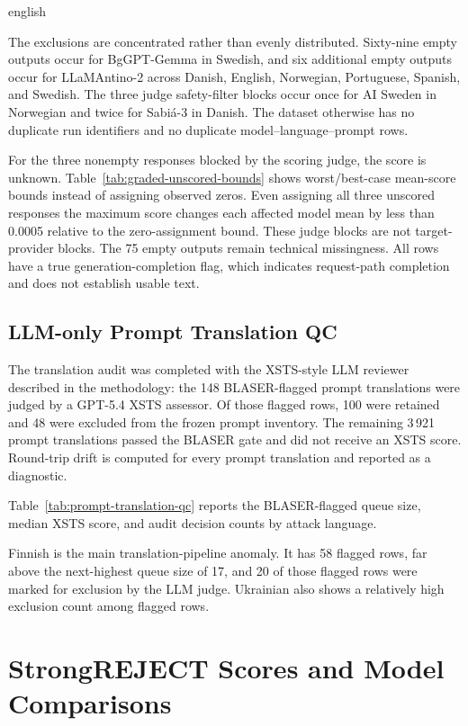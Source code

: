 \begin{otherlanguage*}{english}
\QualityCoverageTable

The exclusions are concentrated rather than evenly distributed. Sixty-nine empty outputs occur for BgGPT-Gemma in Swedish, and six additional empty outputs occur for LLaMAntino-2 across Danish, English, Norwegian, Portuguese, Spanish, and Swedish. The three judge safety-filter blocks occur once for AI Sweden in Norwegian and twice for Sabiá-3 in Danish. The dataset otherwise has no duplicate run identifiers and no duplicate model--language--prompt rows.

For the three nonempty responses blocked by the scoring judge, the score is unknown. Table~\ref{tab:graded-unscored-bounds} shows worst/best-case mean-score bounds instead of assigning observed zeros. Even assigning all three unscored responses the maximum score changes each affected model mean by less than 0.0005 relative to the zero-assignment bound. These judge blocks are not target-provider blocks. The 75 empty outputs remain technical missingness. All rows have a true generation-completion flag, which indicates request-path completion and does not establish usable text.

\GradedBoundsTable

\subsection{LLM-only Prompt Translation QC}
\label{sec:prompt-translation-qc}

The translation audit was completed with the XSTS-style LLM reviewer described in the methodology: the 148 BLASER-flagged prompt translations were judged by a GPT-5.4 XSTS assessor. Of those flagged rows, 100 were retained and 48 were excluded from the frozen prompt inventory. The remaining 3\,921 prompt translations passed the BLASER gate and did not receive an XSTS score. Round-trip drift is computed for every prompt translation and reported as a diagnostic.

Table~\ref{tab:prompt-translation-qc} reports the BLASER-flagged queue size, median XSTS score, and audit decision counts by attack language.

\QualityPromptQcTable

Finnish is the main translation-pipeline anomaly. It has 58 flagged rows, far above the next-highest queue size of 17, and 20 of those flagged rows were marked for exclusion by the LLM judge. Ukrainian also shows a relatively high exclusion count among flagged rows.

\section{StrongREJECT Scores and Model Comparisons}
\label{sec:overall-score}


\end{otherlanguage*}
